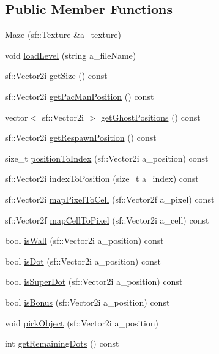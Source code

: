 \subsection*{Public Member Functions}
\begin{DoxyCompactItemize}
\item 
\hyperlink{class_maze_a7d8ebd5ec031891fcb2d76d5b8502e44}{Maze} (sf\+::\+Texture \&a\+\_\+texture)
\item 
void \hyperlink{class_maze_a130c9d8858022b05b083a3f0c630fbaf}{load\+Level} (string a\+\_\+file\+Name)
\item 
sf\+::\+Vector2i \hyperlink{class_maze_a664b89e39391a1551babb93556cb36f8}{get\+Size} () const
\item 
sf\+::\+Vector2i \hyperlink{class_maze_a663cb5481d68d68b8d0483d949a125d8}{get\+Pac\+Man\+Position} () const
\item 
vector$<$ sf\+::\+Vector2i $>$ \hyperlink{class_maze_aaf1dc338270b2674df3f5477a512b0a3}{get\+Ghost\+Positions} () const
\item 
sf\+::\+Vector2i \hyperlink{class_maze_a245890f620b8d7ac3445fd4ca0d090e1}{get\+Respawn\+Position} () const
\item 
size\+\_\+t \hyperlink{class_maze_abae2881894d0dcc53d179f74cc7aa3bd}{position\+To\+Index} (sf\+::\+Vector2i a\+\_\+position) const
\item 
sf\+::\+Vector2i \hyperlink{class_maze_ac256166dfc46cc089de0c998295dbc66}{index\+To\+Position} (size\+\_\+t a\+\_\+index) const
\item 
sf\+::\+Vector2i \hyperlink{class_maze_a6e9ed602dba392b5aaf8b694f5aa6197}{map\+Pixel\+To\+Cell} (sf\+::\+Vector2f a\+\_\+pixel) const
\item 
sf\+::\+Vector2f \hyperlink{class_maze_ad1ed938797ff928c0b90cf176d298429}{map\+Cell\+To\+Pixel} (sf\+::\+Vector2i a\+\_\+cell) const
\item 
bool \hyperlink{class_maze_a51a92b406d8376082d6c4f8c67b1490b}{is\+Wall} (sf\+::\+Vector2i a\+\_\+position) const
\item 
bool \hyperlink{class_maze_a26a1d805927e965b54ffa261a87600b9}{is\+Dot} (sf\+::\+Vector2i a\+\_\+position) const
\item 
bool \hyperlink{class_maze_a52450a5ef93f1d11802969587b5ee00d}{is\+Super\+Dot} (sf\+::\+Vector2i a\+\_\+position) const
\item 
bool \hyperlink{class_maze_a63fd7d817f664bb7b157db12479d89be}{is\+Bonus} (sf\+::\+Vector2i a\+\_\+position) const
\item 
void \hyperlink{class_maze_aff24b90af3ab6bd16c94b6831052d3db}{pick\+Object} (sf\+::\+Vector2i a\+\_\+position)
\item 
int \hyperlink{class_maze_afe0905b13aaefd6135346b3cda931556}{get\+Remaining\+Dots} () const
\end{DoxyCompactItemize}


